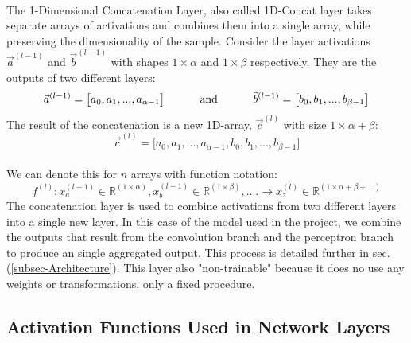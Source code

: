 \documentclass[12pt,letterpaper]{article}
\begin{document}
\paragraph*{}The 1-Dimensional Concatenation Layer, also called 1D-Concat layer takes separate arrays of activations and combines them into a single array, while preserving the dimensionality of the sample. Consider the layer activations $\vec{a}^{(l-1)}$ and $\vec{b}^{(l-1)}$ with shapes  $1 \times \alpha$ and $1 \times \beta$ respectively. They are the outputs of two different layers:
\begin{equation}
\vec{a}^{(l-1)} = \big[ a_{0},  a_{1}, ... ,  a_{\alpha-1} \big]
\text{\hspace{1cm} and \hspace{1cm}}
\vec{b}^{(l-1)} = \big[ b_{0},  b_{1}, ... ,  b_{\beta-1} \big]
\end{equation}
The result of the concatenation is a new 1D-array, $\vec{c}^{(l)}$ with size $1 \times \alpha + \beta$:
\begin{equation}
\vec{c}^{(l)} = \big[ a_{0},  a_{1}, ... ,  a_{\alpha-1}, b_{0},  b_{1}, ... ,  b_{\beta-1} \big]
\end{equation}

\paragraph*{}We can denote this for $n$ arrays with function notation:
\begin{equation}
\label{eqn-ConcatenationFunction}
f^{(l)} : x^{(l-1)}_{a} \in \mathbb{R}^{(1 \times \alpha)} , x^{(l-1)}_{b} \in \mathbb{R}^{(1 \times \beta)} , ....  \rightarrow
x^{(l)}_{z} \in \mathbb{R}^{(1 \times \alpha + \beta + ...)}
\end{equation}
The concatenation layer is used to combine activations from two different layers into a single new layer. In this case of the model used in the project, we combine the outputs that result from the convolution branch and the perceptron branch to produce an single aggregated output. This process is detailed further in sec. (\ref{subsec-Architecture}). This layer also "non-trainable" because it does no use any weights or transformations, only a fixed procedure.


\subsection{Activation Functions Used in Network Layers}
\label{sec-ActivationFunctions}
\end{document}
